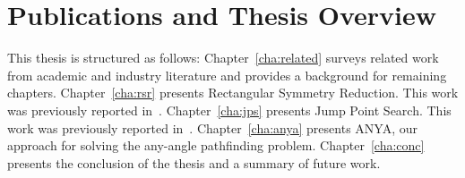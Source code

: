 \section{Publications and Thesis Overview}
\label{cha::intro::pubs}
\label{sec:outline}
This thesis is structured as follows: Chapter~\ref{cha:related}
surveys related work from academic and industry literature and provides 
a background for remaining chapters.
Chapter~\ref{cha:rsr}
presents Rectangular Symmetry Reduction. This work was
previously reported in~\cite{harabor10,harabor11a}.
Chapter~\ref{cha:jps} presents Jump Point Search. This work was
previously reported in~\cite{harabor11b,harabor12}.
Chapter~\ref{cha:anya} presents ANYA, our approach for solving
the any-angle pathfinding problem.
Chapter~\ref{cha:conc} presents the conclusion of the thesis
and a summary of future work.

